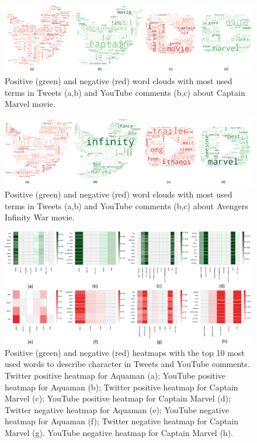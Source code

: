 \begin{figure}[htb]
\begin{center}
    \includegraphics[width=1\linewidth]{img/wordcloudsCaptain.png}
\end{center}
  \caption{Positive (green) and negative (red) word clouds with most used terms in Tweets (a,b) and YouTube comments (b,c) about Captain Marvel movie.}
\label{fig:wordcloudsCaptain}
\end{figure}

\begin{figure}[htb]
\begin{center}
    \includegraphics[width=1\linewidth]{img/wordcloudsAvengers.png}
\end{center}
  \caption{Positive (green) and negative (red) word clouds with most used terms in Tweets (a,b) and YouTube comments (b,c) about Avengers Infinity War movie.}
\label{fig:wordcloudsAvengers}
\end{figure}

%
\begin{figure}[htb]
\begin{center}
    \includegraphics[width=1\linewidth]{img/AquamanCapitaHeatMap.png}
\end{center}
   \caption{Positive (green) and negative (red) heatmaps with the top 10 most used words to describe character in Tweets and YouTube comments. Twitter positive heatmap for Aquaman (a); YouTube positive heatmap for Aquaman (b); Twitter positive heatmap for Captain Marvel (c); YouTube positive heatmap for Captain Marvel (d);
   Twitter negative heatmap for Aquaman (e); YouTube negative heatmap for Aquaman (f); Twitter negative heatmap for Captain Marvel (g). YouTube negative heatmap for Captain Marvel (h).}
\label{fig:AquamanCapitaHeatMap}
\end{figure}

